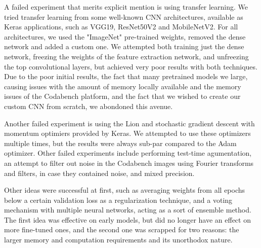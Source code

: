 \documentclass[11pt]{article}
\begin{document}
\begin{multicols}{2}
      A failed experiment that merits explicit mention is using transfer learning\cite{TransferLearning}. We tried transfer learning from some well-known CNN architectures, available as Keras applications, such as VGG19, ResNet50V2 and MobileNetV2. For all architectures, we used the "ImageNet"\cite{ImageNet} pre-trained weights, removed the dense network and added a custom one. We attempted both training just the dense network, freezing the weights of the feature extraction network, and unfreezing the top convolutional layers, but achieved very poor results with both techniques. Due to the poor initial results, the fact that many pretrained models we large, causing issues with the amount of memory locally available and the memory issues of the Codabench platform, and the fact that we wished to create our custom CNN from scratch, we abondoned this avenue.

      Another failed experiment is using the Lion and stochastic gradient descent with momentum optimiers provided by Keras. We attempted to use these optimizers multiple times, but the results were always sub-par compared to the Adam\cite{Kingma2014AdamAM} optimizer. Other failed experiments include performing test-time agumentation, an attempt to filter out noise in the Codabench images using Fourier transforms and filters, in case they contained noise, and mixed precision.

      Other ideas were successful at first, such as averaging weights from all epochs below a certain validation loss as a regularization technique, and a voting mechanism with multiple neural networks, acting as a sort of ensemble method. The first idea was effective on early models, but did no longer have an effect on more fine-tuned ones, and the second one was scrapped for two reasons: the larger memory and computation requirements and its unorthodox nature.



\end{multicols}
\end{document}
